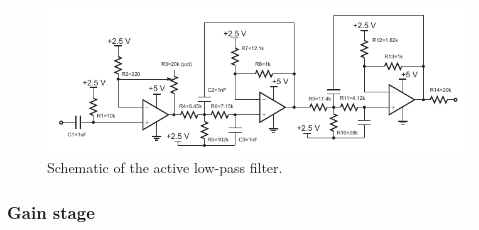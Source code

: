 \documentclass[letterpaper, 11pt]{article}
\begin{document}

\begin{figure}[h]
	\centering
	\includegraphics[width=5.3in]{lpf-sch}
	\caption{Schematic of the active low-pass filter.}
	\label{fig:lpf-sch}
\end{figure}

\subsubsection{Gain stage}
\end{document}
